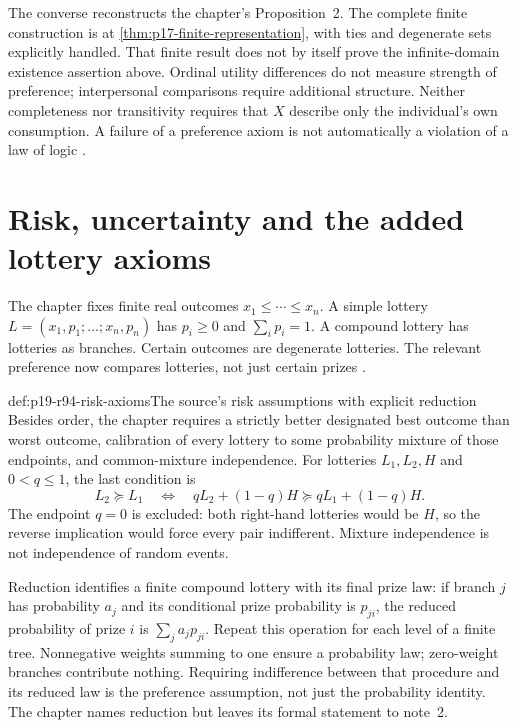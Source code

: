 The converse reconstructs the chapter's Proposition~2. The complete
finite construction is at \cref{thm:p17-finite-representation}, with
ties and degenerate sets explicitly handled. That finite result does not
by itself prove the infinite-domain existence assertion above.
Ordinal utility differences do not measure strength of preference;
interpersonal comparisons require additional structure. Neither
completeness nor transitivity requires that \(X\) describe only the
individual's own consumption. A failure of a preference axiom is not
automatically a violation of a law of logic
\cite[pp.~565--566, 568]{DhamiAlNowaihi2021Economics}.

\section{Risk, uncertainty and the added lottery axioms}
\label{sec:p19-r94-risk}

The chapter fixes finite real outcomes \(x_1\leq\cdots\leq x_n\).
A simple lottery \(L=(x_1,p_1;\ldots;x_n,p_n)\) has
\(p_i\geq0\) and \(\sum_i p_i=1\). A compound lottery has
lotteries as branches. Certain outcomes are degenerate lotteries.
The relevant preference now compares lotteries, not just certain prizes
\cite[pp.~566--567, note~1]{DhamiAlNowaihi2021Economics}.

\begin{hbdefinition}{def:p19-r94-risk-axioms}{The source's risk assumptions with explicit reduction}
Besides order, the chapter requires a strictly better designated best
outcome than worst outcome, calibration of every lottery to some
probability mixture of those endpoints, and common-mixture independence.
For lotteries \(L_1,L_2,H\) and \(0<q\leq1\), the last condition is
\[
 L_2\succeq L_1\quad\Longleftrightarrow\quad
 qL_2+(1-q)H\succeq qL_1+(1-q)H.
\]
The endpoint \(q=0\) is excluded: both right-hand lotteries would be
\(H\), so the reverse implication would force every pair indifferent.
Mixture independence is not independence of random events.

Reduction identifies a finite compound lottery with its final prize law:
if branch \(j\) has probability \(a_j\) and its conditional prize
probability is \(p_{ji}\), the reduced probability of prize \(i\) is
\(\sum_j a_jp_{ji}\). Repeat this operation for each level of a finite
tree. Nonnegative weights summing to one ensure a probability law;
zero-weight branches contribute nothing. Requiring indifference between
that procedure and its reduced law is the preference assumption, not
just the probability identity. The chapter names reduction but leaves
its formal statement to note~2.
\end{hbdefinition}

